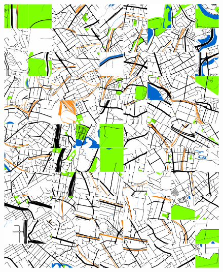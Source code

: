 \documentclass[10pt,letterpaper]{article}
\begin{document}

\begin{figure}[!htbp]
\centering   
\includegraphics[scale=0.12]{Images/PlosOne/Fig11.png}   

\end{figure}
\end{document}
